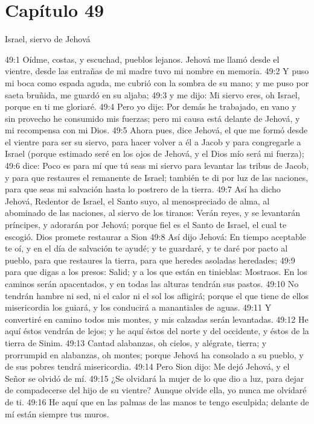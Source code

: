 \section*{Capítulo 49 }
Israel, siervo de Jehová 
 
49:1 Oídme, costas, y escuchad, pueblos lejanos. Jehová me llamó desde el vientre, desde las entrañas de mi madre tuvo mi nombre en memoria. 
49:2 Y puso mi boca como espada aguda, me cubrió con la sombra de su mano; y me puso por saeta bruñida, me guardó en su aljaba; 
49:3 y me dijo: Mi siervo eres, oh Israel, porque en ti me gloriaré. 
49:4 Pero yo dije: Por demás he trabajado, en vano y sin provecho he consumido mis fuerzas; pero mi causa está delante de Jehová, y mi recompensa con mi Dios. 
49:5 Ahora pues, dice Jehová, el que me formó desde el vientre para ser su siervo, para hacer volver a él a Jacob y para congregarle a Israel (porque estimado seré en los ojos de Jehová, y el Dios mío será mi fuerza); 
49:6 dice: Poco es para mí que tú seas mi siervo para levantar las tribus de Jacob, y para que restaures el remanente de Israel; también te di por luz de las naciones, para que seas mi salvación hasta lo postrero de la tierra. 
49:7 Así ha dicho Jehová, Redentor de Israel, el Santo suyo, al menospreciado de alma, al abominado de las naciones, al siervo de los tiranos: Verán reyes, y se levantarán príncipes, y adorarán por Jehová; porque fiel es el Santo de Israel, el cual te escogió. 
Dios promete restaurar a Sion 
49:8 Así dijo Jehová: En tiempo aceptable te oí, y en el día de salvación te ayudé; y te guardaré, y te daré por pacto al pueblo, para que restaures la tierra, para que heredes asoladas heredades; 
49:9 para que digas a los presos: Salid; y a los que están en tinieblas: Mostraos. En los caminos serán apacentados, y en todas las alturas tendrán sus pastos. 
49:10 No tendrán hambre ni sed, ni el calor ni el sol los afligirá; porque el que tiene de ellos misericordia los guiará, y los conducirá a manantiales de aguas. 
49:11 Y convertiré en camino todos mis montes, y mis calzadas serán levantadas. 
49:12 He aquí éstos vendrán de lejos; y he aquí éstos del norte y del occidente, y éstos de la tierra de Sinim. 
49:13 Cantad alabanzas, oh cielos, y alégrate, tierra; y prorrumpid en alabanzas, oh montes; porque Jehová ha consolado a su pueblo, y de sus pobres tendrá misericordia. 
49:14 Pero Sion dijo: Me dejó Jehová, y el Señor se olvidó de mí. 
49:15 ¿Se olvidará la mujer de lo que dio a luz, para dejar de compadecerse del hijo de su vientre? Aunque olvide ella, yo nunca me olvidaré de ti. 
49:16 He aquí que en las palmas de las manos te tengo esculpida; delante de mí están siempre tus muros. 
